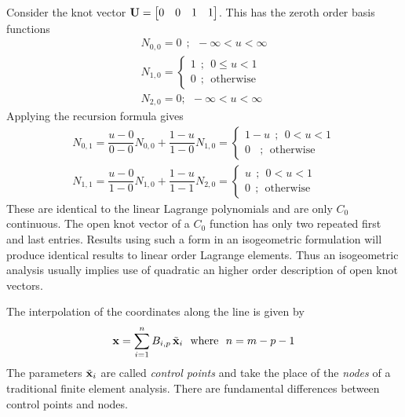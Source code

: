 Consider the knot vector $\mathbf{U} = \begin{bmatrix} 0 & 0 & 1 & 1
\end{bmatrix}$.  This has the zeroth order basis functions
\begin{displaymath}
\begin{array}{l}
N_{0,0} = 0  ~~; ~~  -\infty < u < \infty \\
N_{1,0} = \left\{
\begin{array}{l}
1 ~~; ~~ 0 \le u <  1 \\
0 ~~; ~~ \text{otherwise}
\end{array} \right.\\
N_{2,0} = 0  ; ~~  -\infty < u < \infty
\end{array}
\end{displaymath}
Applying the recursion formula gives
\begin{displaymath}
\begin{array}{l}
N_{0,1} = \dfrac{u-0}{0 - 0} N_{0,0} + \dfrac{1 - u}{1-0} N_{1,0} =
\left\{ \begin{array}{l}
1 - u ~~; ~~ 0 < u <  1 \\
0 ~~ ~~; ~~ \text{otherwise}
\end{array} \right. \\
N_{1,1} = \dfrac{u - 0}{1 - 0} N_{1,0} + \dfrac{ 1 - u}{1 - 1} N_{2,0} =
\left\{
\begin{array}{l}
u ~~; ~~ 0 < u <  1 \\
0 ~~; ~~ \text{otherwise}
\end{array} \right.
\end{array}
\end{displaymath}
These are identical to the linear Lagrange polynomials
and are only $C_0$ continuous.  The open knot vector of a
$C_0$ function has only two repeated first and last entries.
Results using such a form in an isogeometric formulation will produce
identical results to linear order Lagrange elements.  Thus
an isogeometric analysis usually implies use of quadratic an higher order
description of open knot vectors.

The interpolation of the coordinates along the line is given by
\begin{displaymath}
\mathbf{x} = \sum_{i=1}^n B_{i,p} \, \tilde{\mathbf{x}}_i
~~\text{where}~~ n = m - p - 1
\end{displaymath}
The parameters $\tilde{\mathbf{x}}_i$ are called \textit{control points}
and take the place of the \textit{nodes} of a traditional finite
element analysis.  There are fundamental differences between control
points and nodes.

